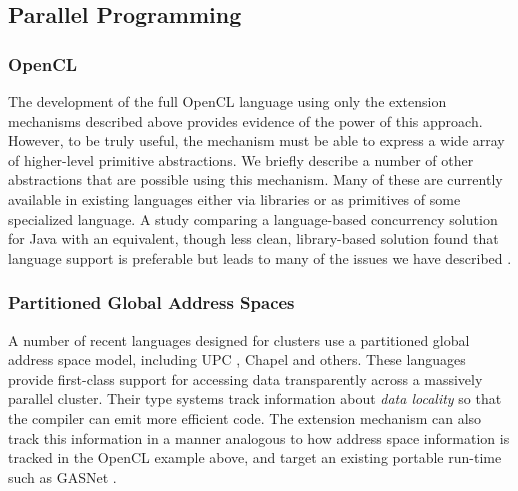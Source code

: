 \documentclass[9pt,preprint]{sigplanconf}
\begin{document}
\subsection{Parallel Programming}
\subsubsection{OpenCL}
The development of the full OpenCL language using only the extension mechanisms described above provides evidence of the power of this approach. However, to be truly useful, the mechanism must be able to express a wide array of higher-level primitive abstractions. We briefly describe a number of other abstractions that are possible using this mechanism. Many of these are currently available in existing languages either via libraries or as primitives of some specialized language. A study comparing a language-based concurrency solution for Java with an equivalent, though less clean, library-based solution found that language support is preferable but leads to many of the issues we have described \cite{cave2010comparing}.

%
\subsubsection{Partitioned Global Address Spaces}
A number of recent languages designed for clusters use a partitioned global address space model, including UPC \cite{upc}, Chapel \cite{chapel} and others. These languages provide first-class support for accessing data transparently across a massively parallel cluster. Their type systems track information about \emph{data locality} so that the compiler can emit more efficient code. The extension mechanism can also track this information in a manner analogous to how address space information is tracked in the OpenCL example above, and target an existing portable run-time such as GASNet \cite{bonachea2002gasnet}.
\end{document}
